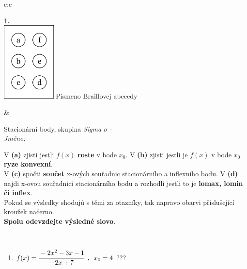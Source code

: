 \documentclass[10pt]{report}
\begin{document}
\begin{tabular}{c:c}
\begin{minipage}[c][104.5mm][t]{0.5\linewidth}
\begin{center}
\begin{minipage}{0.79\linewidth}
\end{minipage}
\begin{minipage}{0.20\linewidth}
\begin{center}
{\Huge\bfseries 1.} \\[2mm]
\includegraphics[height=40mm]{../images/braille.png}
{\small Písmeno Braillovej abecedy}
\end{center}
\end{minipage}
\end{center}
\end{minipage}
&
\begin{minipage}[c][104.5mm][t]{0.5\linewidth}
\begin{center}
\vspace{7mm}
{\huge Stacionární body, skupina \textit{Sigma $\sigma$} -}\\[5mm]
\textit{Jméno:}\phantom{xxxxxxxxxxxxxxxxxxxxxxxxxxxxxxxxxxxxxxxxxxxxxxxxxxxxxxxxxxxxxxxxx}\\[5mm]
\begin{minipage}{0.95\linewidth}
\begin{center}
{\small V \textbf{(a)} zjisti jestli $f(x)$ \textbf{roste} v bode $x_0$. V \textbf{(b)} zjisti jestli je $f(x)$ v bode $x_0$ \textbf{ryze konvexní}.\\V \textbf{(c)} spočti \textbf{součet} x-ových souřadnic stacionárního a inflexního bodu. V \textbf{(d)} najdi x-ovou souřadnici stacionárního bodu a rozhodli jestli to je \textbf{lomax, lomin či inflex}.\\Pokud se výsledky shodujú s těmi za otazníky, tak napravo obarvi příslušející kroužek načerno.\\\textbf{Spolu odevzdejte výsledné slovo}}.
\end{center}
\end{minipage}
\\[1mm]
\begin{minipage}{0.79\linewidth}
\begin{center}
\begin{varwidth}{\linewidth}
\begin{enumerate}
\normalsize
\item $f(x)=\cfrac{-2x^2-3x-1}{-2x+7}\enspace , \enspace x_0=4$\quad \dotfill\; ???\;\dotfill \quad {}

\end{enumerate}
\end{varwidth}
\end{center}
\end{minipage}
\end{center}
\end{minipage}
\end{tabular}
\end{document}
